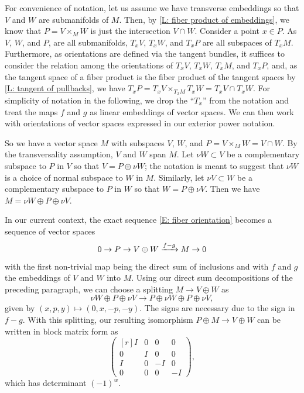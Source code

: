 For convenience of notation, let us assume we have transverse embeddings so that $V$ and $W$ are submanifolds of $M$.
Then, by \cref{L: fiber product of embeddings}, we know that $P = V \times_M W$ is just the intersection $V \cap W$.
Consider a point $x \in P$.
As $V$, $W$, and $P$, are all submanifolds, $T_xV$, $T_xW$, and $T_xP$ are all subspaces of $T_xM$. Furthermore, as orientations are defined via the tangent bundles, it suffices to consider the relation among the orientations of $T_x V$, $T_xW$, $T_xM$, and $T_xP$, and, as the tangent space of a fiber product is the fiber product of the tangent spaces by \cref{L: tangent of pullbacks}, we have $T_xP = T_xV \times_{T_xM} T_xW = T_xV \cap T_xW$.
For simplicity of notation in the following, we drop the ``$T_x$'' from the notation and treat the maps $f$ and $g$ as linear embeddings of vector spaces.
We can then work with orientations of vector spaces expressed in our exterior power notation.

So we have a vector space $M$ with subspaces $V$, $W$, and $P = V \times_M W = V \cap W$.
By the transversality assumption, $V$ and $W$ span $M$.
Let $\nu W \subset V$ be a complementary subspace to $P$ in $V$ so that $V = P \oplus \nu W$; the notation is meant to suggest that $\nu W$ is a choice of normal subspace to $W$ in $M$.
Similarly, let $\nu V \subset W$ be a complementary subspace to $P$ in $W$ so that $W = P \oplus \nu V$.
Then we have $M = \nu W \oplus P \oplus \nu V$. 

In our current context, the exact sequence \eqref{E: fiber orientation} becomes a sequence of vector spaces
\begin{equation*}
	0 \to P \to V \oplus W \xrightarrow{f-g} M \to 0
\end{equation*}
with the first non-trivial map being the direct sum of inclusions and with $f$ and $g$ the embeddings of $V$ and $W$ into $M$.
Using our direct sum decompositions of the preceding paragraph, we can choose a splitting $M \to V \oplus W$ as
\[
\nu W \oplus P \oplus \nu V \to P \oplus \nu W \oplus P \oplus \nu V,
\]
given by $(x,p,y) \mapsto (0, x, -p, -y)$.
The signs are necessary due to the sign in $f-g$.
With this splitting, our resulting isomorphism $P \oplus M \to V \oplus W$ can be written in block matrix form as
\begin{equation}\label{E: orientation matrix}
	\begin{pmatrix*}[r]
		I&0&0&0\\
		0&I&0&0\\
		I&0&-I&0\\
		0&0&0&-I
	\end{pmatrix*},
\end{equation}
which has determinant $(-1)^{w}$.

